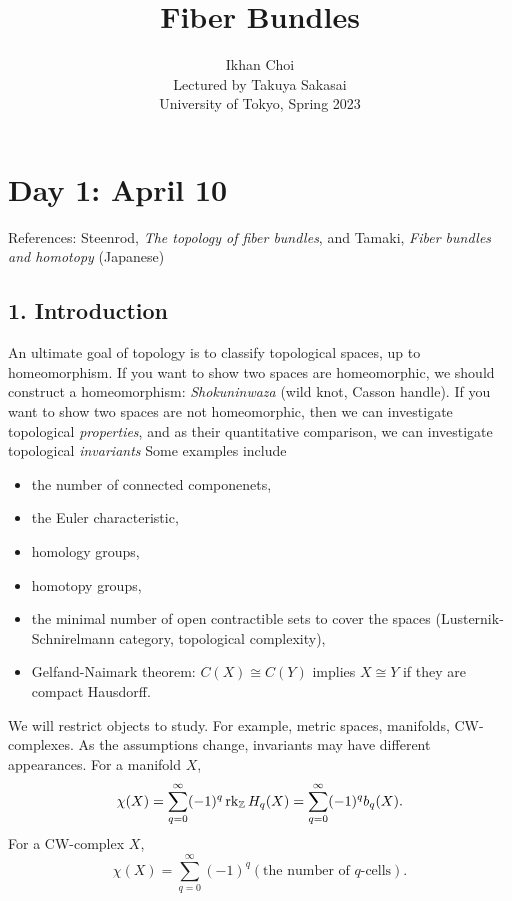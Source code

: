 \documentclass{../../../small}
\begin{document}
\title{Fiber Bundles}
\author{Ikhan Choi\\Lectured by Takuya Sakasai\\University of Tokyo, Spring 2023}
\maketitle
\tableofcontents

\newpage
\section{Day 1: April 10}

References:
Steenrod, \emph{The topology of fiber bundles}, and Tamaki, \emph{Fiber bundles and homotopy} (Japanese)

\subsection*{1. Introduction}

An ultimate goal of topology is to classify topological spaces, up to homeomorphism.
If you want to show two spaces are homeomorphic, we should construct a homeomorphism: \emph{Shokuninwaza} (wild knot, Casson handle).
If you want to show two spaces are not homeomorphic, then we can investigate topological \emph{properties}, and as their quantitative comparison, we can investigate topological \emph{invariants}
Some examples include
\begin{itemize}
\item the number of connected componenets,
\item the Euler characteristic,
\item homology groups,
\item homotopy groups,
\item the minimal number of open contractible sets to cover the spaces (Lusternik-Schnirelmann category, topological complexity),
\item Gelfand-Naimark theorem: $C(X)\cong C(Y)$ implies $X\cong Y$ if they are compact Hausdorff.
\end{itemize}


We will restrict objects to study.
For example, metric spaces, manifolds, CW-complexes.
As the assumptions change, invariants may have different appearances.
For a manifold $X$,
\[\chi(X)=\sum_{q=0}^\infty(-1)^q\operatorname{rk}_{\mathbb{Z}} H_q(X)=\sum_{q=0}^\infty(-1)^qb_q(X).\]
For a CW-complex $X$,
\[\chi(X)=\sum_{q=0}^\infty(-1)^q(\text{the number of $q$-cells}).\]
\end{document}
